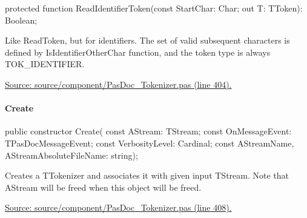 \documentclass{report}
\newif\ifpdf
\begin{document}
\label{PasDoc_Tokenizer.TTokenizer-ReadIdentifierToken}
\begin{list}{}{
\setlength{\itemindent}{0cm}
\setlength{\listparindent}{0cm}
\setlength{\leftmargin}{\evensidemargin}
\addtolength{\leftmargin}{\tmplength}
\settowidth{\labelsep}{X}
\addtolength{\leftmargin}{\labelsep}
\setlength{\labelwidth}{\tmplength}
}
\item[\textbf{Declaration}\hfill]
\ifpdf
\begin{flushleft}
\fi
\begin{ttfamily}
protected function ReadIdentifierToken(const StartChar: Char; out T: TToken): Boolean;\end{ttfamily}

\ifpdf
\end{flushleft}
\fi

\par
\item[\textbf{Description}]
Like ReadToken, but for identifiers. The set of valid subsequent characters is defined by IsIdentifierOtherChar function, and the token type is always TOK{\_}IDENTIFIER.\par
\href{https://github.com/pasdoc/pasdoc/blob/master/source/component/PasDoc_Tokenizer.pas#L404}{Source: source/component/PasDoc{\_}Tokenizer.pas (line 404).}

\end{list}
\paragraph*{Create}\hspace*{\fill}

\label{PasDoc_Tokenizer.TTokenizer-Create}
\begin{list}{}{
\setlength{\itemindent}{0cm}
\setlength{\listparindent}{0cm}
\setlength{\leftmargin}{\evensidemargin}
\addtolength{\leftmargin}{\tmplength}
\settowidth{\labelsep}{X}
\addtolength{\leftmargin}{\labelsep}
\setlength{\labelwidth}{\tmplength}
}
\item[\textbf{Declaration}\hfill]
\ifpdf
\begin{flushleft}
\fi
\begin{ttfamily}
public constructor Create( const AStream: TStream; const OnMessageEvent: TPasDocMessageEvent; const VerbosityLevel: Cardinal; const AStreamName, AStreamAbsoluteFileName: string);\end{ttfamily}

\ifpdf
\end{flushleft}
\fi

\par
\item[\textbf{Description}]
Creates a TTokenizer and associates it with given input TStream. Note that AStream will be freed when this object will be freed.\par
\href{https://github.com/pasdoc/pasdoc/blob/master/source/component/PasDoc_Tokenizer.pas#L408}{Source: source/component/PasDoc{\_}Tokenizer.pas (line 408).}

\end{list}
\end{document}
